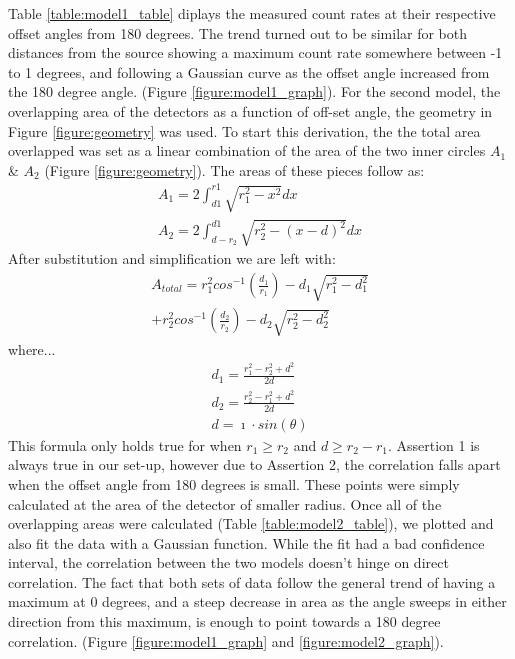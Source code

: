 \documentclass[../final_report_main.tex]{subfiles}
\begin{document}
Table \ref{table:model1_table} diplays the measured count rates at their
respective offset angles from 180 degrees. The trend turned out to be similar
for both distances from the source showing a maximum count rate somewhere
between -1 to 1 degrees, and following a Gaussian curve as the offset angle
increased from the 180 degree angle. (Figure \ref{figure:model1_graph}).
For the second model, the overlapping area of the detectors as a function of
off-set angle, the geometry in Figure \ref{figure:geometry} was used. To start
this derivation, the the total area overlapped was set as a linear combination
of the area of the two inner circles $A_{1}$ \& $A_{2}$ (Figure
\ref{figure:geometry}). The areas of these pieces follow as:
\begin{equation}
  \begin{gathered}
   A_{1} = 2\int_{d1}^{r1}\sqrt{r_{1}^{2}-x^{2}}dx \nonumber\\
   A_{2} = 2\int_{d-r_{2}}^{d1}\sqrt{r_{2}^{2}-(x-d)^{2}}dx \nonumber
  \end{gathered}
\end{equation}
After substitution and simplification we are left with:
\begin{equation}
  \begin{aligned}
  A_{total}=r_{1}^{2}cos^{-1}(\frac{d_{1}}{r_{1}})−d_{1}\sqrt{r_{1}^{2}−d_{1}^
  {2}}\\+r_{2}^{2}cos^{-1}(\frac{d_{2}}{r_{2}})−d_{2}\sqrt{r_{2}^{2}−d_{2}^{2}}
  \nonumber
  \end{aligned}
\end{equation}
where...
\begin{equation}
  \begin{aligned}
  d_{1} = \frac{r_{1}^{2}-r_{2}^{2}+d^{2}}{2d} \nonumber \\ d_{2} =
  \frac{r_{2}^{2}-r_{1}^{2}+d^{2}}{2d} \nonumber \\ d = \imath \cdot sin(\theta)
  \end{aligned}
\end{equation}
This formula only holds true for when $r_{1}\geq r_{2}$ and $d \geq r_{2} -
r_{1}$. Assertion 1 is always true in our set-up, however due to Assertion 2,
the correlation falls apart when the offset angle from 180 degrees is small.
These points were simply calculated at the area of the detector of smaller
radius. Once all of the overlapping areas were calculated (Table
\ref{table:model2_table}), we plotted and also fit the data with a Gaussian
function. While the fit had a bad confidence interval, the correlation between
the two models doesn't hinge on direct correlation. The fact that both sets of
data follow the general trend of having a maximum at 0 degrees, and a steep
decrease in area as the angle sweeps in either direction from this maximum, is
enough to point towards a 180 degree correlation. (Figure
\ref{figure:model1_graph} and \ref{figure:model2_graph}).
\end{document}
